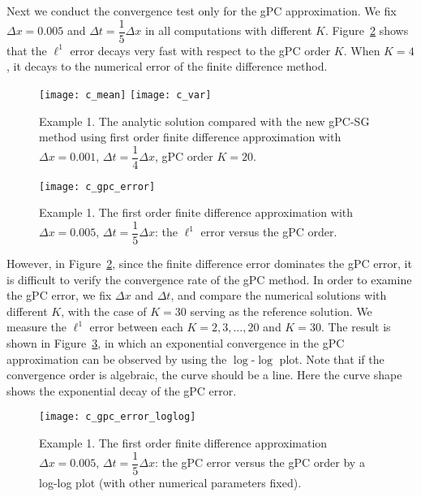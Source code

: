\documentclass[12pt]{article}
\theoremstyle{plain}
\theoremstyle{remark}
\theoremstyle{remark}
\theoremstyle{remark}
\numberwithin{equation}{section}
\newcommand{\Dx}{\Delta x}
\newcommand{\Dt}{\Delta t}
\begin{document}
Next we conduct the convergence test only for the gPC approximation.
We fix $\Dx=0.005$ and $\Dt = \dfrac{1}{5}\Dx$ in all computations with
different $K$. Figure~\ref{4} shows that the $\ell^1$ error decays very fast with respect to the gPC order $K$. When $K=4$, it decays to the numerical error of the finite difference method. 
\begin{figure}[htbp]
  \texttt{[image: c\_mean]}
  \texttt{[image: c\_var]}
  \caption{Example 1. The analytic solution compared with the new gPC-SG method using first order finite difference approximation with $\Dx = 0.001$, $\Dt = \dfrac{1}{4}\Delta x$, gPC order $K=20$.}
  \label{3}
\end{figure}


\begin{figure}[htbp]
  \centering
  \texttt{[image: c\_gpc\_error]}
  \caption{Example 1. The first order finite difference approximation with $\Dx=0.005$, $\Dt=\dfrac{1}{5}\Dx$: the $\ell^1$ error versus the gPC order.}
  \label{4}
\end{figure}

However, in Figure~\ref{4}, since the finite difference error dominates the
gPC error, it is difficult to verify the convergence rate of the gPC method. In order to examine the gPC error, we fix $\Dx$ and $\Dt$, and
compare the numerical solutions with different $K$, with the case of $K=30$ serving as the reference solution.  We measure the $\ell^1$ error between each $K=2,3,\dotsc,20$ and $K=30$. The result is shown 
in Figure~\ref{5}, in which an exponential convergence in the gPC approximation can be observed by using the $\log$-$\log$ plot. Note that if the convergence order is algebraic, the curve should be a line.
Here the curve shape shows the  exponential decay of the gPC error.

\begin{figure}[htbp]
  \centering
  \texttt{[image: c\_gpc\_error\_loglog]}
  \caption{Example 1. The first order finite difference approximation $\Dx=0.005$, $\Dt=\dfrac{1}{5}\Dx$: the gPC error versus the gPC order by a log-log plot
(with other numerical parameters fixed).}
  \label{5}
\end{figure}


%
\end{document}
